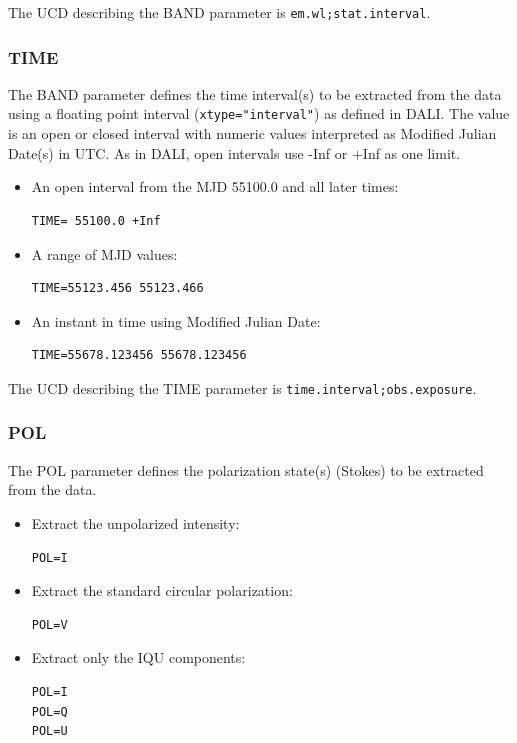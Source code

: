 \documentclass[11pt,a4paper]{ivoa}
\newcommand{\ucd}[1]{\texttt{#1}}
\begin{document}
The UCD describing the BAND parameter is \ucd{em.wl;stat.interval}.


\subsubsection{TIME}
\label{sec:TIME}

The BAND parameter defines the time interval(s) to be extracted from the
data using a floating point interval (\verb|xtype="interval"|) as
defined in DALI.  The value is an open or closed
interval with numeric values interpreted as Modified Julian Date(s) in
UTC. As in DALI, open intervals use -Inf or +Inf as one limit.

\begin{itemize}
\item An open interval from the MJD 55100.0 and all later times:

\begin{lstlisting}
TIME= 55100.0 +Inf
\end{lstlisting}

\item A range of MJD values:

\begin{lstlisting}
TIME=55123.456 55123.466
\end{lstlisting}

\item An instant in time using Modified Julian Date:

\begin{lstlisting}
TIME=55678.123456 55678.123456
\end{lstlisting}
\end{itemize}

The UCD describing the TIME parameter is
\ucd{time.interval;obs.exposure}.


\subsubsection{POL}
\label{sec:POL}

The POL parameter defines the polarization state(s) (Stokes)
to be extracted from the data.

\begin{itemize}
\item Extract the unpolarized intensity:
\begin{lstlisting}
POL=I
\end{lstlisting}
\item Extract the standard circular polarization:
\begin{lstlisting}
POL=V
\end{lstlisting}

\item Extract only the IQU components:
\begin{lstlisting}
POL=I
POL=Q
POL=U
\end{lstlisting}
\end{itemize}
\end{document}

